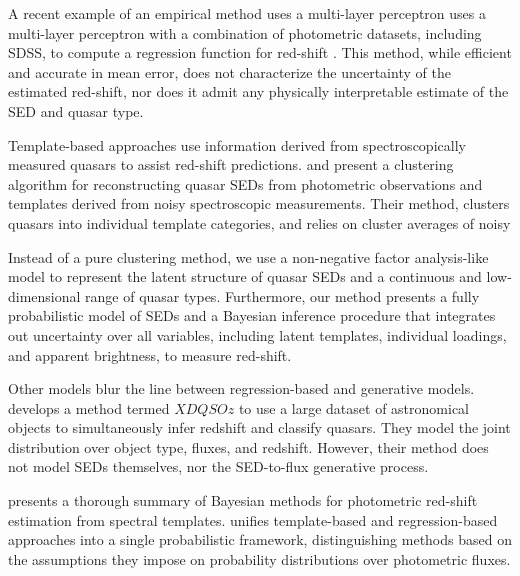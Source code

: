 \documentclass{article}
\begin{document}
A recent example of an empirical method uses a multi-layer perceptron uses a multi-layer perceptron with a combination of photometric datasets, including SDSS, 
to compute a regression function for red-shift \cite{brescia2013photometric}. 
This method, while efficient and accurate in mean error, does not characterize the uncertainty of the estimated red-shift, nor does it admit any physically interpretable estimate of the SED and quasar type.  

Template-based approaches use information derived from spectroscopically measured quasars to assist red-shift predictions.  
\citet{budavari2001photometric} and \citet{richards2001photometric} present a clustering algorithm for reconstructing quasar SEDs from photometric observations and templates derived from noisy spectroscopic measurements.  
Their method, clusters quasars into individual template categories, and relies on cluster averages of noisy 

Instead of a pure clustering method, we use a non-negative factor analysis-like model to represent the latent structure of quasar SEDs and a continuous and low-dimensional range of quasar types.  
Furthermore, our method presents a fully probabilistic model of SEDs and a Bayesian inference procedure that integrates out uncertainty over all variables, including  latent templates, individual loadings, and apparent brightness, to measure red-shift.    

Other models blur the line between regression-based and generative models.  \citet{bovy2012photometric} develops a method termed $XDQSOz$ to use a large dataset of astronomical objects to simultaneously infer redshift and classify quasars.  
They model the joint distribution over object type, fluxes, and redshift.  However, their method does not model SEDs themselves, nor the SED-to-flux generative process. 

\citet{benitez2000bayesian} presents a thorough summary of Bayesian methods for photometric red-shift estimation from spectral templates.  
\citet{budavari2009unified} unifies template-based and regression-based
approaches into a single probabilistic framework, distinguishing methods based on the assumptions they impose on probability distributions over photometric fluxes. 
\end{document}
